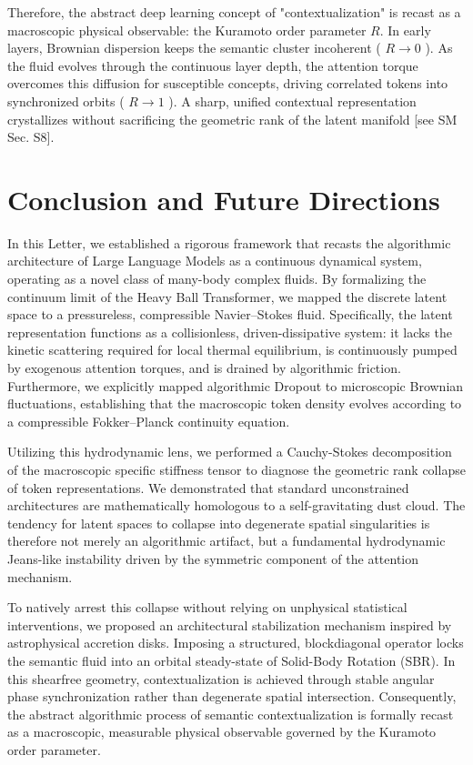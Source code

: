 \documentclass[10pt]{article}
\begin{document}
Therefore, the abstract deep learning concept of "contextualization" is recast as a macroscopic physical observable: the Kuramoto order parameter $R$. In early layers, Brownian dispersion keeps the semantic cluster incoherent ( $R \rightarrow 0$ ). As the fluid evolves through the continuous layer depth, the attention torque overcomes this diffusion for susceptible concepts, driving correlated tokens into synchronized orbits ( $R \rightarrow 1$ ). A sharp, unified contextual representation crystallizes without sacrificing the geometric rank of the latent manifold [see SM Sec. S8].

\section{Conclusion and Future Directions}

In this Letter, we established a rigorous framework that recasts the algorithmic architecture of Large Language Models as a continuous dynamical system, operating as a novel class of many-body complex fluids. By formalizing the continuum limit of the Heavy Ball Transformer, we mapped the discrete latent space to a pressureless, compressible Navier--Stokes fluid. Specifically, the latent representation functions as a collisionless, driven-dissipative system: it lacks the kinetic scattering required for local thermal equilibrium, is continuously pumped by exogenous attention torques, and is drained by algorithmic friction. Furthermore, we explicitly mapped algorithmic Dropout to microscopic Brownian fluctuations, establishing that the macroscopic token density evolves according to a compressible Fokker--Planck continuity equation.

Utilizing this hydrodynamic lens, we performed a Cauchy-Stokes decomposition of the macroscopic specific stiffness tensor to diagnose the geometric rank collapse of token representations. We demonstrated that standard unconstrained architectures are mathematically homologous to a self-gravitating dust cloud. The tendency for latent spaces to collapse into degenerate spatial singularities is therefore not merely an algorithmic artifact, but a fundamental hydrodynamic Jeans-like instability driven by the symmetric component of the attention mechanism.

To natively arrest this collapse without relying on unphysical statistical interventions, we proposed an architectural stabilization mechanism inspired by astrophysical accretion disks. Imposing a structured, blockdiagonal operator locks the semantic fluid into an orbital steady-state of Solid-Body Rotation (SBR). In this shearfree geometry, contextualization is achieved through stable angular phase synchronization rather than degenerate spatial intersection. Consequently, the abstract algorithmic process of semantic contextualization is formally recast as a macroscopic, measurable physical observable governed by the Kuramoto order parameter.
\end{document}
